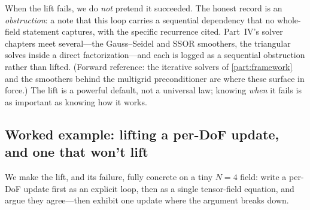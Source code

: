 When the lift fails, we do \emph{not} pretend it succeeded. The honest record is
an \emph{obstruction}: a note that this loop carries a sequential dependency that
no whole-field statement captures, with the specific recurrence cited. Part~IV's
solver chapters meet several---the Gauss--Seidel and SSOR smoothers, the
triangular solves inside a direct factorization---and each is logged as a
sequential obstruction rather than lifted. (Forward reference: the iterative
solvers of \cref{part:framework} and the smoothers behind the multigrid
preconditioner are where these surface in force.) The lift is a powerful default,
not a universal law; knowing \emph{when} it fails is as important as knowing how
it works.

\subsection{Worked example: lifting a per-DoF update, and one that won't lift}
\label{sec:t-wex-lift}

We make the lift, and its failure, fully concrete on a tiny $N=4$ field: write a
per-DoF update first as an explicit loop, then as a single tensor-field equation,
and argue they agree---then exhibit one update where the argument breaks down.

